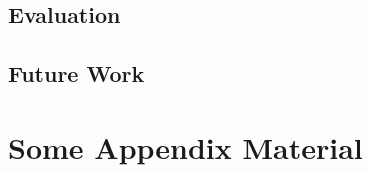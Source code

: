 \documentclass[11pt, a4paper, bibliography=totoc]{report}
\begin{document}
\section{Evaluation}
\section{Future Work}





\appendix
\appendixpage
\noappendicestocpagenum
\addappheadtotoc
\chapter{Some Appendix Material}
\end{document}
